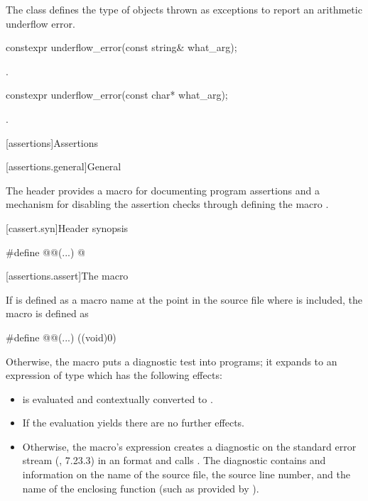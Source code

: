 \pnum
The class
defines the type of objects thrown as exceptions to report an arithmetic underflow error.

%
\begin{itemdecl}
constexpr underflow_error(const string& what_arg);
\end{itemdecl}

\begin{itemdescr}
\pnum
\ensures
{}.
\end{itemdescr}

%
\begin{itemdecl}
constexpr underflow_error(const char* what_arg);
\end{itemdecl}

\begin{itemdescr}
\pnum
\ensures
{}.
\end{itemdescr}

[assertions]{Assertions}

[assertions.general]{General}

\pnum
The header 
provides a macro for documenting \Cpp{} program assertions and a mechanism
for disabling the assertion checks through defining the macro .

[cassert.syn]{Header  synopsis}

\begin{codeblock}
#define @@(...) @\seebelow@
\end{codeblock}

[assertions.assert]{The  macro}

\pnum
If  is defined as a macro name
at the point in the source file where  is included,
the  macro is defined as
\begin{codeblock}
#define @@(...) ((void)0)
\end{codeblock}

\pnum
Otherwise, the  macro puts a diagnostic test into programs;
it expands to an expression of type  which
has the following effects:

\begin{itemize}
\item
{} is evaluated and contextually converted to .
\item
If the evaluation yields  there are no further effects.
\item
Otherwise, the  macro's expression
creates a diagnostic on the standard error stream (\IsoC{}, 7.23.3) in an
format and calls .
The diagnostic contains \tcode{\#} and
information on
the name of the source file,
the source line number, and
the name of the enclosing function
(such as provided by ).
\end{itemize}

